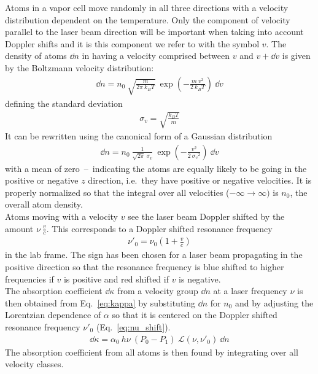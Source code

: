 Atoms in a vapor cell move randomly in all three directions with a velocity 
distribution dependent on the temperature. Only the component of velocity parallel 
to the laser beam direction will be important when taking into account Doppler 
shifts and it is this component we refer to with the symbol \(v \). The density 
of atoms \(\dd n \) in having a velocity comprised between \(v \) and \(v+\dd v \) 
is given by the Boltzmann velocity distribution:
\begin{align}
    \dd n = n_0 ~ \sqrt{ \frac{m}{2\pi~k_B T} }~
    \exp{ \left( -\frac{m~v^2}{2~k_B T} \right ) }~\dd v
\end{align}
defining the standard deviation
\begin{align}
    \sigma_v = \sqrt{\frac{k_B T}{m}}
\end{align}
It can be rewritten using the canonical form of a Gaussian distribution
\begin{align}
    \dd n = n_0~\frac{1}{\sqrt{2\pi}~\sigma_v}~
    \exp{ \left( -\frac{v^2}{2~{\sigma_v}^2} \right ) }~\dd v
\end{align}
with a mean of zero~--~indicating the atoms are equally likely to be going in the
positive or negative \(z \) direction, i.e.\ they have positive or negative 
velocities. It is properly normalized so that the integral over all velocities 
(\(-\infty \rightarrow \infty) \) is \(n_0 \), the overall atom density. \\
Atoms moving with a velocity \(v \) see the laser beam Doppler shifted by the 
amount \(\nu~\frac{v}{c} \). This corresponds to a Doppler shifted resonance frequency
\begin{align}\label{eq:nu_shift}
    \nu'_0 = \nu_0 \left ( 1 + \frac{v}{c} \right)
\end{align}
in the lab frame. The sign has been chosen for a laser beam propagating in the 
positive direction so that the resonance frequency is blue shifted to higher 
frequencies if \(v \) is positive and red shifted if \(v \) is negative.\\
The absorption coefficient \(\dd\kappa \) from a velocity group \(\dd n \) at a 
laser frequency \(\nu \) is then obtained from Eq.~\ref{eq:kappa} by substituting 
\(\dd n \) for \(n_0 \) and by adjusting the Lorentzian dependence of \(\alpha \) 
so that it is centered on the Doppler shifted resonance frequency \(\nu'_0 \) 
(Eq.~\ref{eq:nu_shift}).
\begin{align}
    \dd\kappa = \alpha_0 ~ h\nu ~ (P_0-P_1) ~ \mathcal{L}(\nu,\nu'_0)~\dd n
\end{align}
The absorption coefficient from all atoms is then found by integrating over all 
velocity classes.

